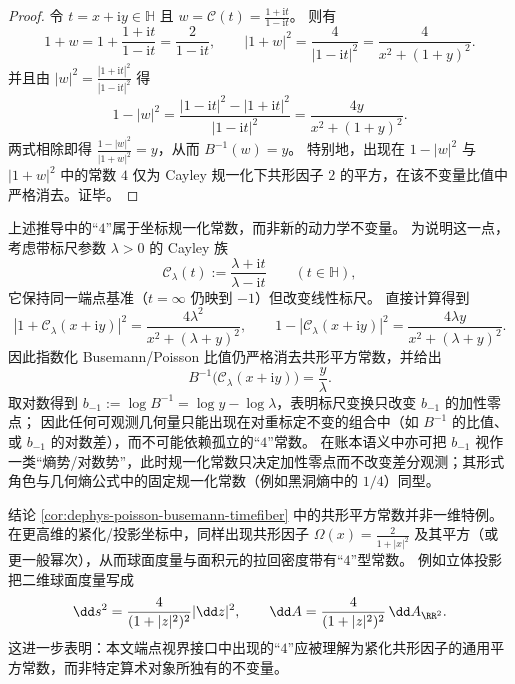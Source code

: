 \begin{proof}
令 \(t=x+\mathrm{i}y\in\mathbb{H}\) 且 \(w=\mathcal{C}(t)=\frac{1+\mathrm{i}t}{1-\mathrm{i}t}\)。
则有
\[
1+w
=1+\frac{1+\mathrm{i}t}{1-\mathrm{i}t}
=\frac{2}{1-\mathrm{i}t},
\qquad
|1+w|^2=\frac{4}{|1-\mathrm{i}t|^2}=\frac{4}{x^2+(1+y)^2}.
\]
并且由
\(
|w|^2=\frac{|1+\mathrm{i}t|^2}{|1-\mathrm{i}t|^2}
\)
得
\[
1-|w|^2
=\frac{|1-\mathrm{i}t|^2-|1+\mathrm{i}t|^2}{|1-\mathrm{i}t|^2}
=\frac{4y}{x^2+(1+y)^2}.
\]
两式相除即得 \(\frac{1-|w|^2}{|1+w|^2}=y\)，从而 \(B^{-1}(w)=y\)。
特别地，出现在 \(1-|w|^2\) 与 \(|1+w|^2\) 中的常数 \(4\) 仅为 Cayley 规一化下共形因子 \(2\) 的平方，在该不变量比值中严格消去。证毕。
\end{proof}

\begin{remark}\label{rem:dephys-cayley-scale-gauge-four}
上述推导中的“\(4\)”属于坐标规一化常数，而非新的动力学不变量。
为说明这一点，考虑带标尺参数 \(\lambda>0\) 的 Cayley 族
\[
\mathcal{C}_{\lambda}(t):=\frac{\lambda+\mathrm{i}t}{\lambda-\mathrm{i}t}\qquad(t\in\mathbb{H}),
\]
它保持同一端点基准（\(t=\infty\) 仍映到 \(-1\)）但改变线性标尺。
直接计算得到
\[
|1+\mathcal{C}_{\lambda}(x+\mathrm{i}y)|^2
=\frac{4\lambda^2}{x^2+(\lambda+y)^2},
\qquad
1-|\mathcal{C}_{\lambda}(x+\mathrm{i}y)|^2
=\frac{4\lambda y}{x^2+(\lambda+y)^2}.
\]
因此指数化 Busemann/Poisson 比值仍严格消去共形平方常数，并给出
\[
B^{-1}\!\bigl(\mathcal{C}_{\lambda}(x+\mathrm{i}y)\bigr)=\frac{y}{\lambda}.
\]
取对数得到 \(b_{-1}:=\log B^{-1}=\log y-\log\lambda\)，表明标尺变换只改变 \(b_{-1}\) 的加性零点；
因此任何可观测几何量只能出现在对重标定不变的组合中（如 \(B^{-1}\) 的比值、或 \(b_{-1}\) 的对数差），而不可能依赖孤立的“\(4\)”常数。
在账本语义中亦可把 \(b_{-1}\) 视作一类“熵势/对数势”，此时规一化常数只决定加性零点而不改变差分观测；其形式角色与几何熵公式中的固定规一化常数（例如黑洞熵中的 \(1/4\)）同型。
\end{remark}

\begin{remark}\label{rem:dephys-conformal-factor-2square-area-law}
结论 \ref{cor:dephys-poisson-busemann-timefiber} 中的共形平方常数并非一维特例。
在更高维的紧化/投影坐标中，同样出现共形因子 \(\Omega(x)=\frac{2}{1+|x|^2}\) 及其平方（或更一般幂次），从而球面度量与面积元的拉回密度带有“\(4\)”型常数。
例如立体投影把二维球面度量写成
\[
\dd s^2=\frac{4}{(1+|z|^2)^2}|\dd z|^2,
\qquad
\dd A=\frac{4}{(1+|z|^2)^2}\,\dd A_{\RR^2}.
\]
这进一步表明：本文端点视界接口中出现的“\(4\)”应被理解为紧化共形因子的通用平方常数，而非特定算术对象所独有的不变量。
\end{remark}


